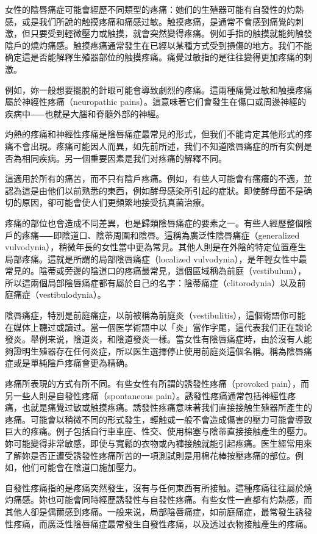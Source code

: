 \documentclass[12pt,UTF8]{ctexbook}
\begin{document}
女性的陰唇痛症可能會經歷不同類型的疼痛：她们的生殖器可能有自發性的灼熱感，或是我们所說的触摸疼痛和痛感过敏。触摸疼痛，是通常不會感到痛覺的刺激，但只要受到輕微壓力或触摸，就會突然變得疼痛。例如手指的触摸就能夠触發陰戶的燒灼痛感。触摸疼痛通常發生在已經以某種方式受到損傷的地方。我们不能确定這是否能解釋生殖器部位的触摸疼痛。痛覺过敏指的是往往變得更加疼痛的刺激。

例如，妳一般想要擺脫的針眼可能會導致劇烈的疼痛。這兩種痛覺过敏和触摸疼痛屬於神經性疼痛（neuropathic pains）。這意味著它们會發生在傷口或周邊神經的疾病中⸺也就是大腦和脊髓外部的神經。

灼熱的疼痛和神經性疼痛是陰唇痛症最常見的形式，但我们不能肯定其他形式的疼痛不會出現。疼痛可能因人而異，如先前所述，我们不知道陰唇痛症的所有实例是否為相同疾病。另一個重要因素是我们对疼痛的解釋不同。

這適用於所有的痛苦，而不只有陰戶疼痛。例如，有些人可能會有瘙癢的不適，並認為這是由他们以前熟悉的東西，例如酵母感染所引起的症狀。即使酵母菌不是确切的原因，卻可能會使人们更頻繁地接受抗真菌治療。

疼痛的部位也會造成不同差異，也是歸類陰唇痛症的要素之一。有些人經歷整個陰戶的疼痛⸺即陰道口、陰蒂周圍和陰唇。這稱為廣泛性陰唇痛症（generalized vulvodynia），稍微年長的女性當中更為常見。其他人則是在外陰的特定位置產生局部疼痛。這就是所謂的局部陰唇痛症（localized vulvodynia），是年輕女性中最常見的。陰蒂或旁邊的陰道口的疼痛最常見，這個區域稱為前庭（vestibulum），所以這兩個局部陰唇痛症都有屬於自己的名字：陰蒂痛症（clitorodynia）以及前庭痛症（vestibulodynia）。

陰唇痛症，特別是前庭痛症，以前被稱為前庭炎（vestibulitis），這個術語你可能在媒体上聽过或讀过。當一個医学術語中以「炎」當作字尾，這代表我们正在談论發炎。舉例来说，陰道炎，和陰道發炎一樣。當女性有陰唇痛症時，由於沒有人能夠證明生殖器存在任何炎症，所以医生選擇停止使用前庭炎這個名稱。稱為陰唇痛症或是單純陰戶疼痛會更為精确。

疼痛所表現的方式有所不同。有些女性有所謂的誘發性疼痛（provoked pain），而另一些人則是自發性疼痛（spontaneous pain）。誘發性疼痛通常包括神經性疼痛，也就是痛覺过敏或触摸疼痛。誘發性疼痛意味著我们直接接触生殖器所產生的疼痛。可能會以稍微不同的形式發生，輕触或一般不會造成傷害的壓力可能會導致巨大的疼痛。例子包括自行車車座、性交、使用棉塞与陰蒂直接接触產生的壓力。妳可能變得非常敏感，即使与寬鬆的衣物或內褲接触就能引起疼痛。医生經常用來了解妳是否正遭受誘發性疼痛所苦的一項測試則是用棉花棒按壓疼痛的部位。例如，他们可能會在陰道口施加壓力。

自發性疼痛指的是疼痛突然發生，沒有与任何東西有所接触。這種疼痛往往屬於燒灼痛感。妳也可能會同時經歷誘發性与自發性疼痛。有些女性一直都有灼熱感，而其他人卻是偶爾感到疼痛。一般来说，局部陰唇痛症，如前庭痛症，最常發生誘發性疼痛，而廣泛性陰唇痛症最常發生自發性疼痛，以及透过衣物接触產生的疼痛。
\end{document}
